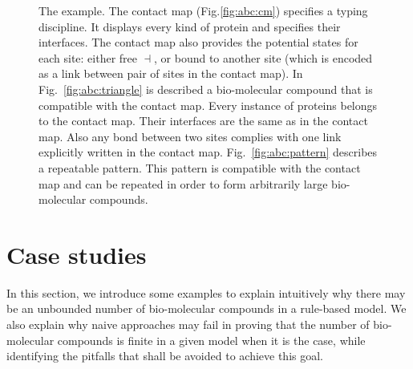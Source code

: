 \documentclass{entcs}
\newcommand{\freesymbol}{\dashv}
\begin{document}
\begin{figure}
\caption{The  example.
The contact map  (Fig.\ref{fig:abc:cm}) specifies a typing discipline.
It displays every kind of protein and specifies their interfaces.
The contact map also provides the potential states for each site:
either free $\freesymbol$, or bound to another site (which is encoded as a link between pair of sites in the contact map).
In Fig.~\ref{fig:abc:triangle} is described a bio-molecular compound that is compatible with the contact map. Every instance of proteins belongs to the contact map. Their interfaces are the same as in the contact map.
Also any bond between two sites complies with one link explicitly written in the contact map.
Fig.~\ref{fig:abc:pattern} describes a repeatable pattern.
This pattern is compatible with the contact map and can be repeated in order to form arbitrarily large bio-molecular compounds.
}\label{fig:abc}
\end{figure}
\section{Case studies}
\label{sec:case-study}

In this section, we introduce some examples to explain intuitively why there may be an unbounded number of bio-molecular compounds in a rule-based model.  We also explain why naive approaches may fail in proving that the number of bio-molecular compounds is finite in a given model when it is the case,  while identifying the pitfalls that shall be avoided to achieve this goal.
\end{document}
